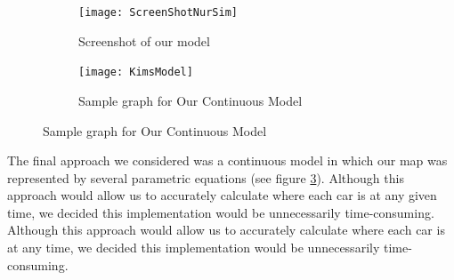 \documentclass[11pt]{article}
\begin{document}
\begin{figure}
	
	\centering
	\begin{subfigure}{.35\textwidth}
		\centering
		\texttt{[image: ScreenShotNurSim]}
		\caption{Screenshot of  our model }
		\label{NurScreenshot}
	\end{subfigure}
	\begin{subfigure}{.35\textwidth}
		\centering
		\texttt{[image: KimsModel]}
		\caption{Sample graph for Our Continuous Model}
		\label{KimModel}
	\end{subfigure}
\end{figure}	
%		

	The final approach we considered was a continuous model in which our map was represented by several parametric equations (see figure \ref{KimModel}). 
	Although this approach would allow us to accurately calculate where each car is at any given time, we decided this implementation would be unnecessarily time-consuming.  
	Although this approach would allow us to accurately calculate where each car is at any time, we decided this implementation would be unnecessarily time-consuming.  
\end{document}
